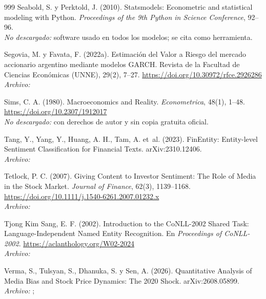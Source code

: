 \begin{thebibliography}{999}
Seabold, S. y Perktold, J. (2010). Statsmodels: Econometric and statistical modeling with Python. \emph{Proceedings of the 9th Python in Science Conference}, 92--96.
\\\textit{No descargado:} software usado en todos los modelos; se cita como herramienta.

Segovia, M. y Favata, F. (2022a). Estimación del Valor a Riesgo del mercado accionario argentino mediante modelos GARCH. Revista de la Facultad de Ciencias Económicas (UNNE), 29(2), 7–27. \url{https://doi.org/10.30972/rfce.2926286}
\\\textit{Archivo:} 

Sims, C. A. (1980). Macroeconomics and Reality. \emph{Econometrica}, 48(1), 1--48. \url{https://doi.org/10.2307/1912017}
\\\textit{No descargado:} con derechos de autor y sin copia gratuita oficial.

Tang, Y., Yang, Y., Huang, A. H., Tam, A. et~al. (2023). {FinEntity}: Entity-level Sentiment Classification for Financial Texts. arXiv:2310.12406.
\\\textit{Archivo:} 

Tetlock, P. C. (2007). Giving Content to Investor Sentiment: The Role of Media in the Stock Market. \emph{Journal of Finance}, 62(3), 1139--1168. \url{https://doi.org/10.1111/j.1540-6261.2007.01232.x}
\\\textit{Archivo:} 

Tjong Kim Sang, E. F. (2002). Introduction to the {CoNLL-2002} Shared Task: Language-Independent Named Entity Recognition. En \emph{Proceedings of CoNLL-2002}. \url{https://aclanthology.org/W02-2024}
\\\textit{Archivo:} 

Verma, S., Tulsyan, S., Dhanuka, S. y Sen, A. (2026). Quantitative Analysis of Media Bias and Stock Price Dynamics: The 2020 Shock. arXiv:2608.05899.
\\\textit{Archivo:} ; 


\end{thebibliography}
